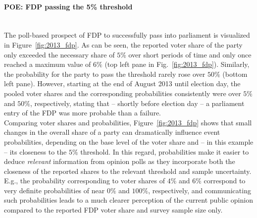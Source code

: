 \documentclass[smallcondensed]{svjour3}     %
\begin{document}
\paragraph{POE: FDP passing the 5\% threshold} \ \\

The poll-based prospect of FDP to successfully pass into parliament is visualized
in Figure~\ref{fig:2013_fdp}.
As can be seen, the reported voter share of the party only exceeded the necessary share
of $5\%$ over short periods of time and only once reached a maximum value
of $6\%$ (top left pane in Fig.~\ref{fig:2013_fdp}). Similarly, the probability
for the party to pass the threshold rarely rose over $50\%$ (bottom left pane).
However, starting at the end of August 2013 until election day, the pooled voter
shares and the corresponding probabilities consistently were over $5\%$ and $50\%$,
respectively, stating that -- shortly before election day -- a parliament entry
of the FDP was more probable than a failure.\\

Comparing voter shares and probabilities, Figure~\ref{fig:2013_fdp} shows
that small changes in the overall share of a party can dramatically influence
event probabilities, depending on the base level of the voter share and
-- in this example -- its closeness to the $5\%$ threshold.
In this regard, probabilities make it easier to deduce {\it relevant} information
from opinion polls as they incorporate both the closeness of the reported shares
to the relevant threshold and sample uncertainty.
E.g., the probability corresponding to voter shares of $4\%$ and $6\%$ correspond to
very definite probabilities of near $0\%$ and $100\%$, respectively,
and communicating such probabilities leads to a much clearer perception of
the current public opinion compared to the reported FDP voter share and
survey sample size only.
\end{document}
